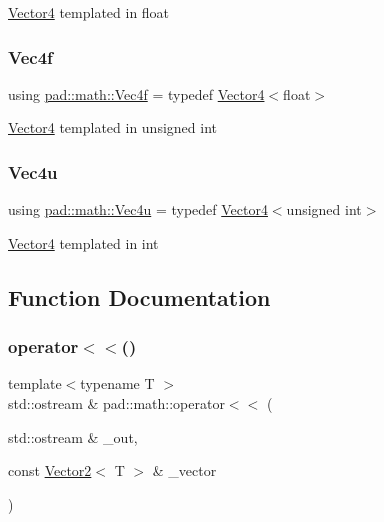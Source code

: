 \mbox{\hyperlink{structpad_1_1math_1_1_vector4}{Vector4}} templated in float \mbox{\label{namespacepad_1_1math_a4eb77014ac7b74bd24cf73bca82ac3a3}} 
\subsubsection{\texorpdfstring{Vec4f}{Vec4f}}
{\footnotesize\ttfamily using \mbox{\hyperlink{namespacepad_1_1math_a4eb77014ac7b74bd24cf73bca82ac3a3}{pad\+::math\+::\+Vec4f}} = typedef \mbox{\hyperlink{structpad_1_1math_1_1_vector4}{Vector4}}$<$float$>$}

\mbox{\hyperlink{structpad_1_1math_1_1_vector4}{Vector4}} templated in unsigned int \mbox{\label{namespacepad_1_1math_ad5b8d7d51edf8173f6a0ddbbb792c803}} 
\subsubsection{\texorpdfstring{Vec4u}{Vec4u}}
{\footnotesize\ttfamily using \mbox{\hyperlink{namespacepad_1_1math_ad5b8d7d51edf8173f6a0ddbbb792c803}{pad\+::math\+::\+Vec4u}} = typedef \mbox{\hyperlink{structpad_1_1math_1_1_vector4}{Vector4}}$<$unsigned int$>$}

\mbox{\hyperlink{structpad_1_1math_1_1_vector4}{Vector4}} templated in int 

\subsection{Function Documentation}
\mbox{\label{namespacepad_1_1math_aef2c4cef650688967cb74c75c5d4aafa}} 
\subsubsection{\texorpdfstring{operator$<$$<$()}{operator<<()}\hspace{0.1cm}{\footnotesize\ttfamily [1/3]}}
{\footnotesize\ttfamily template$<$typename T $>$ \\
std\+::ostream \& pad\+::math\+::operator$<$$<$ (\begin{DoxyParamCaption}\item[{std\+::ostream \&}]{\+\_\+out,  }\item[{const \mbox{\hyperlink{structpad_1_1math_1_1_vector2}{Vector2}}$<$ T $>$ \&}]{\+\_\+vector }\end{DoxyParamCaption})}

